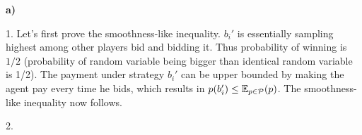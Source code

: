 \textbf{a)} 

1. Let's first prove the smoothness-like inequality. $b_i'$ is essentially sampling highest among other players bid and bidding it. Thus probability of winning is $1/2$ (probability of random variable being bigger than identical random variable is 1/2). The payment under strategy $b_i'$ can be upper bounded by making the agent pay every time he bids, which results in $p(b_i')\leq \mathbb E_{p\in \cal P}(p)$. The smoothness-like inequality now follows.

2. 